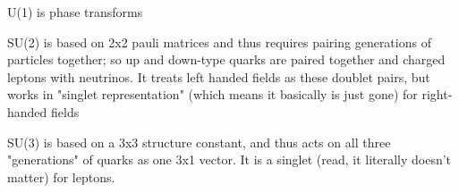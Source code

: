     U(1) is phase transforms

    SU(2) is based on 2x2 pauli matrices and thus requires pairing generations of particles together;
        so up and down-type quarks are paired together and charged leptons with neutrinos.
    It treats left handed fields as these doublet pairs,
        but works in "singlet representation" (which means it basically is just gone) for right-handed fields

    SU(3) is based on a 3x3 structure constant, and thus acts on all three "generations" of quarks as one 3x1 vector.
    It is a singlet (read, it literally doesn't matter) for leptons.
    
    \cite{Osborn_notes}
    \cite{Peskin_book}
    \cite{Halzen_book}

